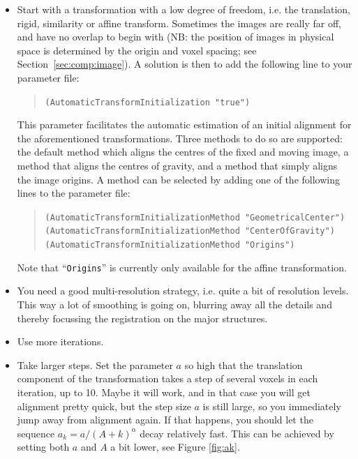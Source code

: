 \documentclass[]{report}
\begin{document}
\begin{itemize}
\item Start with a transformation with a low degree of freedom,
i.e. the translation, rigid, similarity or affine transform.
Sometimes the images are really far off, and have no overlap to
begin with (NB: the position of images in physical space is
determined by the origin and voxel spacing; see
Section~\ref{sec:comp:image}). A solution is then to add the
following line to your parameter file:
\begin{quote}
  \texttt{(AutomaticTransformInitialization "true")}
\end{quote}
This parameter facilitates the automatic estimation of an initial
alignment for the aforementioned transformations. Three methods to
do so are supported: the default method which aligns the centres of
the fixed and moving image, a method that aligns the centres of
gravity, and a method that simply aligns the image origins. A method
can be selected by adding one of the following lines to the
parameter file:
\begin{quote}
  \texttt{(AutomaticTransformInitializationMethod "GeometricalCenter")} \\
  \texttt{(AutomaticTransformInitializationMethod "CenterOfGravity")} \\
  \texttt{(AutomaticTransformInitializationMethod "Origins")}
\end{quote}
Note that ``\texttt{Origins}'' is currently only available for the
affine transformation.

\item You need a good multi-resolution strategy, i.e.
quite a bit of resolution levels. This way a lot of smoothing is
going on, blurring away all the details and thereby focussing the
registration on the major structures.

\item Use more iterations.

\item Take larger steps. Set the
parameter $a$ so high that the translation component of the
transformation takes a step of several voxels in each iteration, up
to 10. Maybe it will work, and in that case you will get alignment
pretty quick, but the step size $a$ is still large, so you
immediately jump away from alignment again. If that happens, you
should let the sequence $a_k = a / (A+k)^{\alpha}$ decay relatively
fast. This can be achieved by setting both $a$ and $A$ a bit lower,
see Figure \ref{fig:ak}.


\end{itemize}
\end{document}
